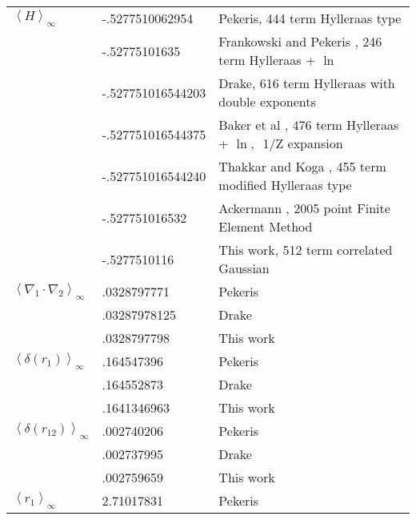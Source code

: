 \documentclass[12pt,thmsa]{article}
\begin{document}
\begin{table}[tbp] \centering%
\begin{tabular}{lll}
\hline\hline
$\left\langle H\right\rangle _\infty $ & -.5277510062954 & {\footnotesize %
Pekeris}\cite{Pekeris62}{\footnotesize , 444 term Hylleraas type} \\ 
& -.52775101635 & {\footnotesize Frankowski and Pekeris}\cite{Frankowski66}%
{\footnotesize , 246 term Hylleraas + }$\ln $ \\ 
& -.527751016544203 & {\footnotesize Drake}\cite{Drake88}{\footnotesize ,
616 term Hylleraas with double exponents} \\ 
& -.527751016544375 & {\footnotesize Baker et al }\cite{Baker90}%
{\footnotesize , 476 term Hylleraas + }$\ln ,${\footnotesize \ 1/Z expansion}
\\ 
& -.527751016544240 & {\footnotesize Thakkar and Koga}\cite{Thakkar94}%
{\footnotesize , 455 term modified Hylleraas type} \\ 
& -.527751016532 & {\footnotesize Ackermann}\cite{Ackermann95}{\footnotesize %
, 2005 point Finite Element Method} \\ 
& -.5277510116 & {\footnotesize This work, 512 term correlated Gaussian} \\ 
\hline
$\left\langle \nabla _1\cdot \nabla _2\right\rangle _\infty $ & .0328797771
& {\footnotesize Pekeris}\cite{Pekeris62} \\ 
& .03287978125 & {\footnotesize Drake}\cite{Drake88} \\ 
& .0328797798 & {\footnotesize This work} \\ \hline
$\left\langle \delta \left( r_1\right) \right\rangle _\infty $ & .164547396
& {\footnotesize Pekeris}\cite{Pekeris62} \\ 
& .164552873 & {\footnotesize Drake}\cite{Drake88} \\ 
& .1641346963 & {\footnotesize This work} \\ \hline
$\left\langle \delta \left( r_{12}\right) \right\rangle _\infty $ & 
.002740206 & {\footnotesize Pekeris}\cite{Pekeris62} \\ 
& .002737995 & {\footnotesize Drake}\cite{Drake88} \\ 
& .002759659 & {\footnotesize This work} \\ \hline
$\left\langle r_1\right\rangle _\infty $ & 2.71017831 & {\footnotesize %
Pekeris}\cite{Pekeris62} \\ 

\end{tabular}
\end{table}
\end{document}
